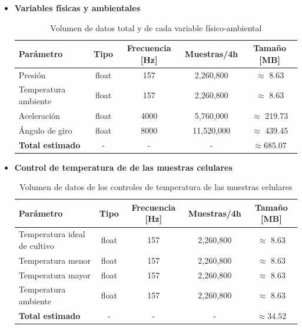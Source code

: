     \begin{itemize}

      \item \textbf{Variables físicas y ambientales}

      \begin{table}[H]
      \centering
      \begin{tabular}{|l|c|c|c|c|}
      \hline
      \textbf{Parámetro} & \textbf{Tipo} & \textbf{Frecuencia [Hz]} & \textbf{Muestras/4h} & \textbf{Tamaño [MB]} \\
      \hline
      Presión               & float & 157   & 2,260,800  & $\approx$ 8.63     \\
      Temperatura ambiente  & float & 157   & 2,260,800  & $\approx$ 8.63     \\
      Aceleración           & float & 4000  & 5,760,000  & $\approx$ 219.73   \\
      Ángulo de giro        & float & 8000  & 11,520,000 & $\approx$ 439.45   \\
      \hline
      \textbf{Total estimado} & -    & -     & -         & $\boldsymbol{\approx 685.07}$ \\
      \hline
      \end{tabular}
      \caption{Volumen de datos total y de cada variable físico-ambiental}
      \label{tab:volumen_datos}
      \end{table}

      \item \textbf{Control de temperatura de de las muestras celulares}

      \begin{table}[H]
      \centering
      \begin{tabular}{|l|c|c|c|c|}
      \hline
      \textbf{Parámetro} & \textbf{Tipo} & \textbf{Frecuencia [Hz]} & \textbf{Muestras/4h} & \textbf{Tamaño [MB]} \\
      \hline
      Temperatura ideal de cultivo & float & 157 & 2,260,800 & $\approx$ 8.63 \\
      Temperatura menor            & float & 157 & 2,260,800 & $\approx$ 8.63 \\
      Temperatura mayor            & float & 157 & 2,260,800 & $\approx$ 8.63 \\
      Temperatura ambiente         & float & 157 & 2,260,800 & $\approx$ 8.63 \\
      \hline
      \textbf{Total estimado}      & -     & -   & -         & $\boldsymbol{\approx 34.52}$ \\
      \hline
      \end{tabular}
      \caption{Volumen de datos de los controles de temperatura de las muestras celulares}
      \label{tab:volumen_datos_temperatura}
      \end{table}


\end{itemize}
